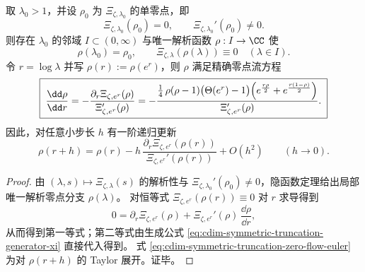 \begin{theorem}\label{thm:cdim-symmetric-truncation-zero-flow}
取 \(\lambda_0>1\)，并设 \(\rho_0\) 为 \(\Xi_{\zeta,\lambda_0}\) 的单零点，即
\[
\Xi_{\zeta,\lambda_0}(\rho_0)=0,
\qquad
\Xi_{\zeta,\lambda_0}'(\rho_0)\neq 0.
\]
则存在 \(\lambda_0\) 的邻域 \(I\subset(0,\infty)\) 与唯一解析函数 \(\rho:I\to\CC\) 使
\[
\rho(\lambda_0)=\rho_0,
\qquad
\Xi_{\zeta,\lambda}(\rho(\lambda))\equiv 0\quad(\lambda\in I).
\]
令 \(r=\log\lambda\) 并写 \(\rho(r):=\rho(e^r)\)，则 \(\rho\) 满足精确零点流方程
\begin{equation}\label{eq:cdim-symmetric-truncation-zero-flow}
\boxed{\;
\frac{\dd\rho}{\dd r}
=-\frac{\partial_r\Xi_{\zeta,e^r}(\rho)}{\Xi_{\zeta,e^r}'(\rho)}
=-\frac{\frac14\,\rho(\rho-1)\bigl(\Theta(e^r)-1\bigr)\Bigl(e^{\frac{r\rho}{2}}+e^{\frac{r(1-\rho)}{2}}\Bigr)}
{\Xi_{\zeta,e^r}'(\rho)}.\;}
\end{equation}
因此，对任意小步长 \(h\) 有一阶递归更新
\begin{equation}\label{eq:cdim-symmetric-truncation-zero-flow-euler}
\boxed{\;
\rho(r+h)
=\rho(r)-h\,\frac{\partial_r\Xi_{\zeta,e^r}(\rho(r))}{\Xi_{\zeta,e^r}'(\rho(r))}
+O(h^2)\qquad(h\to 0).\;}
\end{equation}
\end{theorem}
\begin{proof}
由 \((\lambda,s)\mapsto \Xi_{\zeta,\lambda}(s)\) 的解析性与 \(\Xi_{\zeta,\lambda_0}'(\rho_0)\neq 0\)，隐函数定理给出局部唯一解析零点分支 \(\rho(\lambda)\)。
对恒等式 \(\Xi_{\zeta,e^r}(\rho(r))\equiv 0\) 对 \(r\) 求导得到
\[
0=\partial_r\Xi_{\zeta,e^r}(\rho)+\Xi_{\zeta,e^r}'(\rho)\,\frac{\dd\rho}{\dd r},
\]
从而得到第一等式；第二等式由生成公式 \eqref{eq:cdim-symmetric-truncation-generator-xi} 直接代入得到。
式 \eqref{eq:cdim-symmetric-truncation-zero-flow-euler} 为对 \(\rho(r+h)\) 的 Taylor 展开。证毕。
\end{proof}

